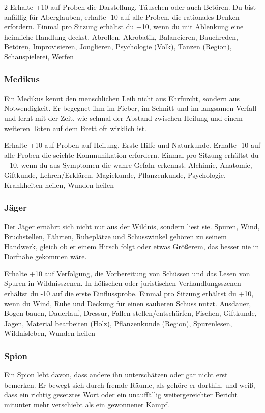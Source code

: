 {\begin{multicols*}{2}
        \wegespielwertebox
        {Erhalte +10 auf Proben die Darstellung, Täuschen oder auch Betören.}
        {Du bist anfällig für Aberglauben, erhalte -10 auf alle Proben, die rationales Denken erfordern.}
        {Einmal pro Sitzung erhältst du +10, wenn du mit Ablenkung eine heimliche Handlung deckst.}
        {Abrollen, Akrobatik, Balancieren, Bauchreden, Betören, Improvisieren, Jonglieren, Psychologie (Volk), Tanzen (Region), Schauspielerei, Werfen}

        \subsubsection*{Medikus}
        Ein Medikus kennt den menschlichen Leib nicht aus Ehrfurcht, sondern aus Notwendigkeit. Er begegnet ihm im Fieber, im Schnitt und im langsamen Verfall und lernt mit der Zeit, wie schmal der Abstand zwischen Heilung und einem weiteren Toten auf dem Brett oft wirklich ist.

        \wegespielwertebox
        {Erhalte +10 auf Proben auf Heilung, Erste Hilfe und Naturkunde.}
        {Erhalte -10 auf alle Proben die seichte Kommunikation erfordern.}
        {Einmal pro Sitzung erhältst du +10, wenn du aus Symptomen die wahre Gefahr erkennst.}
        {Alchimie, Anatomie, Giftkunde, Lehren/Erklären, Magiekunde, Pflanzenkunde, Psychologie, Krankheiten heilen, Wunden heilen}

        \subsubsection*{Jäger}
        Der Jäger ernährt sich nicht nur aus der Wildnis, sondern liest sie. Spuren, Wind, Bruchstellen, Fährten, Ruheplätze und Schusswinkel gehören zu seinem Handwerk, gleich ob er einem Hirsch folgt oder etwas Größerem, das besser nie in Dorfnähe gekommen wäre.

        \wegespielwertebox
        {Erhalte +10 auf Verfolgung, die Vorbereitung von Schüssen und das Lesen von Spuren in Wildnisszenen.}
        {In höfischen oder juristischen Verhandlungsszenen erhältst du -10 auf die erste Einflussprobe.}
        {Einmal pro Sitzung erhältst du +10, wenn du Wind, Ruhe und Deckung für einen sauberen Schuss nutzt.}
        {Ausdauer, Bogen bauen, Dauerlauf, Dressur, Fallen stellen/entschärfen, Fischen, Giftkunde, Jagen, Material bearbeiten (Holz), Pflanzenkunde (Region), Spurenlesen, Wildnisleben, Wunden heilen}

        \subsubsection*{Spion}
        Ein Spion lebt davon, dass andere ihn unterschätzen oder gar nicht erst bemerken. Er bewegt sich durch fremde Räume, als gehöre er dorthin, und weiß, dass ein richtig gesetztes Wort oder ein unauffällig weitergereichter Bericht mitunter mehr verschiebt als ein gewonnener Kampf.


\end{multicols*}}
